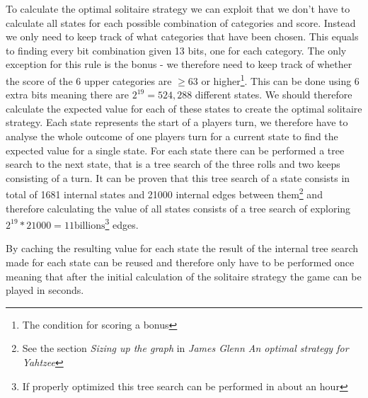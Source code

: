 To calculate the optimal solitaire strategy we can exploit that we don't have to calculate all states for each possible combination of categories and score. Instead we only need to keep track of what categories that have been chosen. This equals to finding every bit combination given 13 bits, one for each category. The only exception for this rule is the bonus - we therefore need to keep track of whether the score of the 6 upper categories are $\geq 63$ or higher\footnote{The condition for scoring a bonus}. This can be done using 6 extra bits meaning there are $2^{19} = 524,288$ different states. We should therefore calculate the expected value for each of these states to create the optimal solitaire strategy.
Each state represents the start of a players turn, we therefore have to analyse the whole outcome of one players turn for a current state to find the expected value for a single state. For each state there can be performed a tree search to the next state, that is a tree search of the three rolls and two keeps consisting of a turn. It can be proven that this tree search of a state consists in total of 1681 internal states and 21000 internal edges between them\footnote{See the section \emph{Sizing up the graph} in \emph{James Glenn An optimal strategy for Yahtzee}\cite{glenn2006optimal}} and therefore calculating the value of all states consists of a tree search of exploring $2^{19} * 21000 = 11\mbox{billions}$\footnote{If properly optimized this tree search can be performed in about an hour} edges. 

By caching the resulting value for each state the result of the internal tree search made for each state can be reused and therefore only have to be performed once meaning that after the initial calculation of the solitaire strategy the game can be played in seconds.
